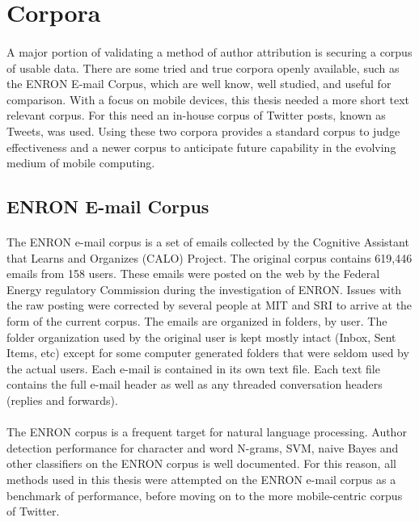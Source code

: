 \section{Corpora}
	\paragraph{}A major portion of validating a method of author attribution is securing a corpus of usable data.  There are some tried and true corpora openly available, such as the ENRON E-mail Corpus, which are well know, well studied, and useful for comparison.  With a focus on mobile devices, this thesis needed a more short text relevant corpus.  For this need an in-house corpus of Twitter posts, known as Tweets, was used.  Using these two corpora provides a standard corpus to judge effectiveness and a newer corpus to anticipate future capability in the evolving medium of mobile computing.
	\subsection{ENRON E-mail Corpus}
		\paragraph{} The ENRON e-mail corpus is a set of emails collected by the Cognitive Assistant that Learns and Organizes (CALO) Project.  The original corpus contains 619,446 emails from 158 users.  These emails were posted on the web by the Federal Energy regulatory Commission during the investigation of ENRON.  Issues with the raw posting were corrected by several people at MIT and SRI to arrive at the form of the current corpus.  The emails are organized in folders, by user.  The folder organization used by the original user is kept mostly intact (Inbox, Sent Items, etc) except for some computer generated folders that were seldom used by the actual users.  Each e-mail is contained in its own text file.  Each text file contains the full e-mail header as well as any threaded conversation headers (replies and forwards).\cite{_enron_????}
		\paragraph{} The ENRON corpus is a frequent target for natural language processing.  Author detection performance for character and word N-grams, SVM, naive Bayes and other classifiers on the ENRON corpus is well documented. For this reason, all methods used in this thesis were attempted on the ENRON e-mail corpus as a benchmark of performance, before moving on to the more mobile-centric corpus of Twitter.

